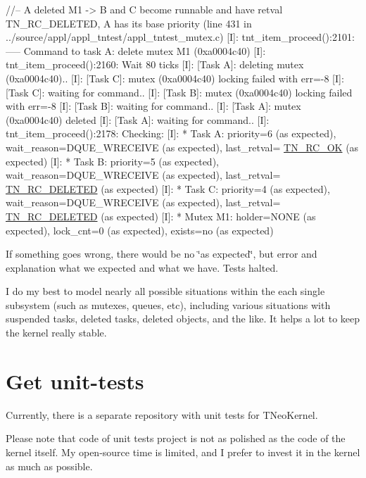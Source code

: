 \begin{DoxyCode}
\textcolor{comment}{//-- A deleted M1 -> B and C become runnable and have retval TN\_RC\_DELETED, A has its base priority (line
       431 in ../source/appl/appl\_tntest/appl\_tntest\_mutex.c) }
[I]: tnt\_item\_proceed():2101: ----- Command to task A: delete mutex M1 (0xa0004c40) 
[I]: tnt\_item\_proceed():2160: Wait 80 ticks 
[I]: [Task A]: deleting mutex (0xa0004c40).. 
[I]: [Task C]: mutex (0xa0004c40) locking failed with err=-8 
[I]: [Task C]: waiting for command.. 
[I]: [Task B]: mutex (0xa0004c40) locking failed with err=-8 
[I]: [Task B]: waiting for command.. 
[I]: [Task A]: mutex (0xa0004c40) deleted 
[I]: [Task A]: waiting for command.. 
[I]: tnt\_item\_proceed():2178: Checking: 
[I]: * Task A: priority=6 (as expected), wait\_reason=DQUE\_WRECEIVE (as expected), last\_retval=
      \hyperlink{tn__common_8h_aa43bd3da1ad4c1e61224b5f23b369876afb291924237186f5765865256c75e639}{TN\_RC\_OK} (as expected) 
[I]: * Task B: priority=5 (as expected), wait\_reason=DQUE\_WRECEIVE (as expected), last\_retval=
      \hyperlink{tn__common_8h_aa43bd3da1ad4c1e61224b5f23b369876a3252967d2fdefcfbd4eb720ed4663d84}{TN\_RC\_DELETED} (as expected) 
[I]: * Task C: priority=4 (as expected), wait\_reason=DQUE\_WRECEIVE (as expected), last\_retval=
      \hyperlink{tn__common_8h_aa43bd3da1ad4c1e61224b5f23b369876a3252967d2fdefcfbd4eb720ed4663d84}{TN\_RC\_DELETED} (as expected) 
[I]: * Mutex M1: holder=NONE (as expected), lock\_cnt=0 (as expected), exists=no (as expected) 
\end{DoxyCode}


If something goes wrong, there would be no {\ttfamily \char`\"{}as expected\char`\"{}}, but error and explanation what we expected and what we have. Tests halted.

I do my best to model nearly all possible situations within the each single subsystem (such as mutexes, queues, etc), including various situations with suspended tasks, deleted tasks, deleted objects, and the like. It helps a lot to keep the kernel really stable.\hypertarget{unit_tests_get_tests}{}\section{Get unit-\/tests}\label{unit_tests_get_tests}
Currently, there is a separate repository with unit tests for T\+Neo\+Kernel.

Please note that code of unit tests project is not as polished as the code of the kernel itself. My open-\/source time is limited, and I prefer to invest it in the kernel as much as possible.

